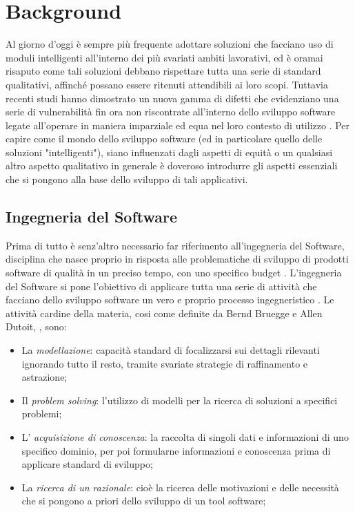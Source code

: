 \chapter{Background} %

Al giorno d'oggi è sempre più frequente adottare soluzioni che facciano uso di moduli intelligenti all'interno dei più svariati ambiti lavorativi, ed è oramai risaputo come tali soluzioni debbano rispettare tutta una serie di standard qualitativi, affinché possano essere ritenuti attendibili ai loro scopi. Tuttavia recenti studi hanno dimostrato un nuova gamma di difetti che evidenziano una serie di vulnerabilità fin ora non riscontrate all'interno dello sviluppo software  legate all'operare in maniera imparziale ed equa nel loro contesto di utilizzo \cite{brun2018software}. Per capire come il mondo dello sviluppo software (ed in particolare quello delle soluzioni "intelligenti"), siano influenzati dagli aspetti di equità o un qualsiasi altro aspetto qualitativo in generale è doveroso introdurre gli aspetti essenziali che si pongono alla base dello sviluppo di tali applicativi.

\section{Ingegneria del Software}
Prima di tutto è senz'altro necessario far riferimento all'ingegneria del Software, disciplina che nasce proprio in risposta alle problematiche di sviluppo di prodotti software di qualità in un preciso tempo, con uno specifico budget \cite{Bruegge2009ObjectOrientedSE}. L'ingegneria del Software si pone l'obiettivo di applicare tutta una serie di attività che facciano dello sviluppo software un vero e proprio processo ingegneristico \cite{mall2018fundamentals}.  Le attività cardine della materia, cosi come definite da Bernd Bruegge e Allen Dutoit, \cite{Bruegge2009ObjectOrientedSE}, sono:

\begin{itemize}
    \item La \emph{modellazione}: capacità standard di focalizzarsi sui dettagli rilevanti ignorando tutto il resto, tramite svariate strategie di raffinamento e astrazione;
    \item Il \emph{problem solving}: l'utilizzo di modelli per la ricerca di soluzioni a specifici problemi;
    \item L' \emph{acquisizione di conoscenza}: la raccolta di singoli dati e informazioni di uno specifico dominio, per poi formularne informazioni e conoscenza prima di applicare standard di sviluppo;
    \item La \emph{ricerca di un razionale}: cioè la ricerca delle motivazioni e delle necessità che si pongono a priori dello sviluppo di un tool software;
\end{itemize}

